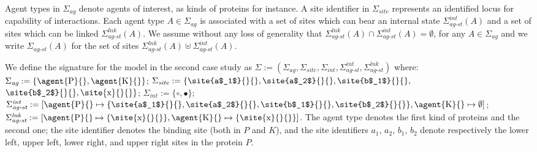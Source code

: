 \documentclass[10pt,a4paper]{llncs}
\newcommand{\bydef}{\stackrel{\scalebox{0.8}{\!\!$\scriptscriptstyle{\triangle}$}}{=}}
\renewcommand{\bydef}{:=}
\newcommand{\statename}{\signaturesymb_{\textit{int}}}
\newcommand{\agentname}{\signaturesymb_{\textit{ag}}}
\newcommand{\sitename}{\signaturesymb_{\textit{site}}}
\newcommand{\linksite}{\signaturesymb^{\textit{lnk}}_{\textit{ag-st}}}
\newcommand{\statesite}{\signaturesymb^{\textit{int}}_{\textit{ag-st}}}
\newcommand{\bothsite}{\signaturesymb_{\textit{ag-st}}}
\newcommand{\signaturesymb}{\Sigma}
\newcommand{\signaturetuple}{(\agentname,\sitename,\statename,\statesite,\linksite)}
\begin{document}
Agent types in $\agentname$ denote agents of interest, as kinds of proteins for instance.
A site identifier in $\sitename$ represents an identified locus for capability of interactions.
Each agent type $A\in\agentname$ is associated with a set of sites which can bear an internal state $\statesite(A)$  and a set of sites which can be linked $\linksite(A)$. We assume without any loss of generality that $\linksite(A)\cap\statesite(A)=\emptyset$, for any $A\in\agentname$ and we write $\bothsite(A)$ for the set of sites $\linksite(A)\uplus\statesite(A)$.

\begin{example}%
\label{ex:signature}We define the signature for the model in the second case study as
 $\signaturesymb\bydef\signaturetuple$ where:
 $\agentname \bydef \{\text{\agent{P}{}},\text{\agent{K}{}}\}$;
 $\sitename \bydef \{\text{\site{a$_1$}{}{}},\text{\site{a$_2$}{}{}}, \text{\site{b$_1$}{}{}},$ $\text{\site{b$_2$}{}{}}, \text{\site{x}{}{}}\}$;
 $\statename \bydef \{\circ,\bullet\}$;
 $\statesite \bydef [\text{\agent{P}{}} \mapsto \{\text{\site{a$_1$}{}{}},\text{\site{a$_2$}{}{}},\text{\site{b$_1$}{}{}},\text{\site{b$_2$}{}{}}\},\text{\agent{K}{}} \mapsto \emptyset]$;
 $\linksite \bydef [\text{\agent{P}{}}\mapsto \{\text{\site{x}{}{}}\}, \text{\agent{K}{}} \mapsto \{\text{\site{x}{}{}}\}]$.
  The agent type  denotes the first kind of proteins and  the second one;
  the site identifier  denotes the binding site (both in $P$ and $K$), and the site identifiers $a_1$, $a_2$, $b_1$, $b_2$ denote respectively the lower left, upper left, lower right, and upper right sites in the protein $P$.
\end{example}
\end{document}
